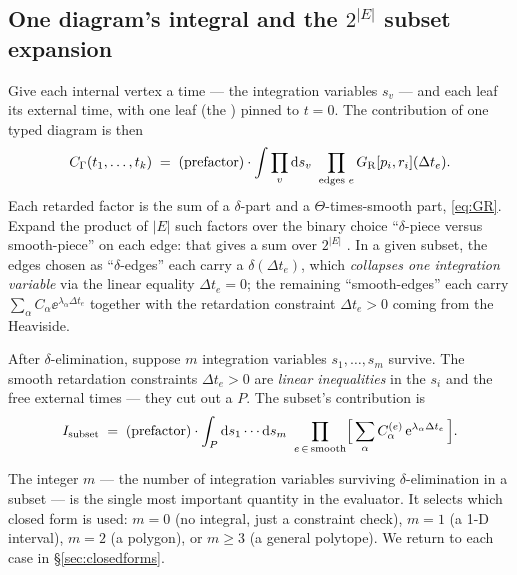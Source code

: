 \subsection{One diagram's integral and the $2^{|E|}$ subset expansion}

Give each internal vertex a time --- the integration variables $s_v$ --- and each
leaf its external time, with one leaf (the ) pinned to $t=0$.
The contribution of one typed diagram is then
\begin{equation}
  C_\Gamma(t_1,\dots,t_k)
  \;=\;
  (\text{prefactor})\cdot
  \int \prod_v \mathrm{d} s_v\ \prod_{\text{edges } e} G_{\mathrm R}[p_i, r_i](\Delta t_e) .
  \label{eq:onediagram}
\end{equation}
Each retarded factor is the sum of a $\delta$-part and a $\Theta$-times-smooth
part, \eqref{eq:GR}. Expand the product of $|E|$ such factors over the binary
choice ``$\delta$-piece versus smooth-piece'' on each edge: that gives a sum over
$2^{|E|}$ . In a given subset, the edges chosen as
``$\delta$-edges'' each carry a $\delta(\Delta t_e)$, which \emph{collapses one
integration variable} via the linear equality $\Delta t_e = 0$; the remaining
``smooth-edges'' each carry $\sum_\alpha C_\alpha \ee^{\lambda_\alpha \Delta t_e}$
together with the retardation constraint $\Delta t_e > 0$ coming from the
Heaviside.

After $\delta$-elimination, suppose $m$ integration variables $s_1,\dots,s_m$
survive. The smooth retardation constraints $\Delta t_e > 0$ are \emph{linear
inequalities} in the $s_i$ and the free external times --- they cut out a
 $P$. The subset's contribution is
\begin{equation}
  I_{\text{subset}}
  \;=\;
  (\text{prefactor})\cdot
  \int_P \mathrm{d} s_1 \cdots \mathrm{d} s_m\
  \prod_{e\,\in\,\text{smooth}}
  \Bigl[\,\sum_\alpha C^{(e)}_\alpha\, \mathrm{e}^{\lambda_\alpha \Delta t_e}\,\Bigr] .
  \label{eq:subset}
\end{equation}

\begin{defn}
The integer $m$ --- the number of integration variables surviving
$\delta$-elimination in a subset --- is the single most important quantity in the
evaluator. It selects which closed form is used: $m=0$ (no integral, just a
constraint check), $m=1$ (a 1-D interval), $m=2$ (a polygon), or $m\ge 3$ (a
general polytope). We return to each case in \S\ref{sec:closedforms}.
\end{defn}

